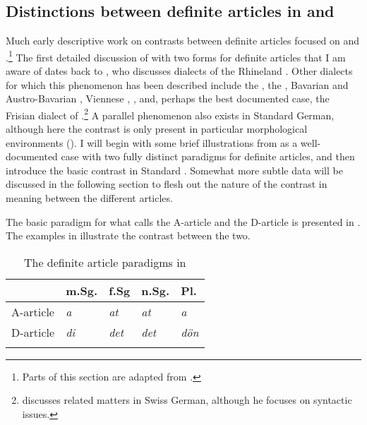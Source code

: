 \documentclass[output=paper
,modfonts
,nonflat]{langscibook}
\begin{document}
\subsection{Distinctions between definite
  articles in  and }

Much early descriptive work on contrasts between definite articles focused on  and .\footnote{Parts of this section are adapted from \citet{Schwarz2013}.} The first
detailed discussion of  with two forms for definite articles that I am aware of dates back to\linebreak
\citet{Heinrichs1954}, who discusses dialects of the Rhineland
\citep[see also][]{Hartmann1967}. Other dialects for which this
phenomenon has been described include 
the 
\citep{Hartmann1982}, 
the  \citep{Himmelmann1997},
Bavarian \citep{Scheutz1988,Schwager2007} 
and Austro-Bavarian \citep{BruggerPrinzhorn1996,Wiltschko2013},
Viennese \citep{SchusterSchikola1984},
 \citep{Schmitt2006},
and, perhaps the best
documented case, the Frisian dialect of 
\citep{Ebert1971,Ebert1971b}.\footnote{\citet{Leu2008} discusses
  related matters in Swiss German, although he focuses
  on syntactic issues.}  A parallel phenomenon also exists in
Standard German, although here the contrast is only present in
particular morphological environments
(\citealt{Hartmann1978,Hartmann1980,Haberland1985,Cieschinger2006,Waldmuller2008,Schwarz2009}). I
will begin with some brief illustrations from  as a
well-documented case with two fully distinct paradigms for definite
articles, and then introduce the basic contrast in Standard
. Somewhat more subtle  data will be discussed in the
following section to flesh out the nature of the contrast in meaning
between the different articles.

The basic paradigm for what \citet{Ebert1971b} calls the A-article and
the D-article is presented in . The
examples in  illustrate the contrast between the two.

\begin{table}[h]
	\begin{tabular}{lllll} 
		\lsptoprule
		& {m.Sg.} & {f.Sg} & {n.Sg.} & {Pl}.\\
		\midrule
		{A-article} & \textit{a} & \textit{at} & \textit{at} & \textit{a}\\
		{D-article} & \textit{di} & \textit{det} & \textit{det} & \textit{d\"on}\\
		\lspbottomrule
	\end{tabular}
	\caption{The definite article paradigms in  \citep[159]{Ebert1971b}\label{tab:schwarz:1}}
\end{table}
\end{document}
